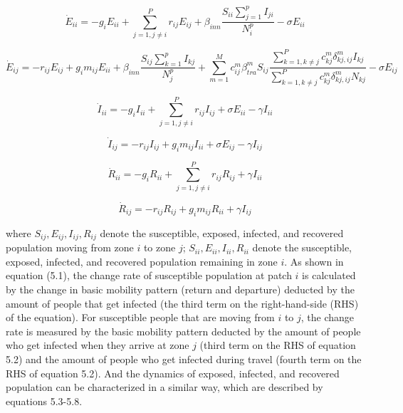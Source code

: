 \documentclass[review]{elsarticle}
\theoremstyle{plain}
\theoremstyle{definition}
\theoremstyle{remark}
\numberwithin{equation}{section}
\theoremstyle{remark}
\begin{document}
\begin{equation}
\dot{E}_{ii}=-g_{i}E_{ii}+\sum_{j=1,j\neq i}^{P}r_{ij}E_{ij}+\beta_{inn}\frac{S_{ii}\sum_{j=1}^{p}I_{ji}}{N_i^p}-\sigma E_{ii}
\end{equation}

\begin{equation}
\dot{E}_{ij}=-r_{ij}E_{ij}+g_i m_{ij}E_{ii}+\beta_{inn}\frac{S_{ij}\sum_{k=1}^{p}I_{kj}}{N_j^p}+\sum_{m=1}^M c_{ij}^{m} \beta_{tra}^m S_{ij}\frac{\sum_{k=1,k\neq j}^P c_{kj}^m \delta_{kj,ij}^m I_{kj}}{\sum_{k=1,k\neq j}^P c_{kj}^m \delta_{kj,ij}^m N_{kj}}-\sigma E_{ij}
\end{equation}

\begin{equation}
	\dot{I}_{ii}=-g_{i}I_{ii}+\sum_{j=1,j\neq i}^{P}r_{ij}I_{ij}+\sigma E_{ii}-\gamma I_{ii}
\end{equation}

\begin{equation}
	\dot{I}_{ij}=-r_{ij}I_{ij}+g_i m_{ij}I_{ii}+\sigma E_{ij}-\gamma I_{ij}
\end{equation}

\begin{equation}
\dot{R}_{ii}=-g_{i}R_{ii}+\sum_{j=1,j\neq i}^{P}r_{ij}R_{ij}+\gamma I_{ii}
\end{equation}

\begin{equation}
\dot{R}_{ij}=-r_{ij}R_{ij}+g_i m_{ij}R_{ii}+\gamma I_{ij}
\end{equation}


where $S_{ij}, E_{ij}, I_{ij}, R_{ij}$ denote the susceptible, exposed, infected, and recovered population moving from zone $i$ to zone $j$; $S_{ii}, E_{ii}, I_{ii}, R_{ii}$ denote the susceptible, exposed, infected, and recovered population remaining in zone $i$. As shown in equation (5.1), the change rate of susceptible population at patch $i$ is calculated by the change in basic mobility pattern (return and departure) deducted by the amount of people that get infected (the third term on the right-hand-side (RHS) of the equation). For susceptible people that are moving from $i$ to $j$, the change rate is measured by the basic mobility pattern deducted by the amount of people who get infected when they arrive at zone $j$ (third term on the RHS of equation 5.2) and the amount of people who get infected during travel (fourth term on the RHS of equation 5.2). And the dynamics of exposed, infected, and recovered population can be characterized in a similar way, which are described by equations 5.3-5.8.  
\end{document}
